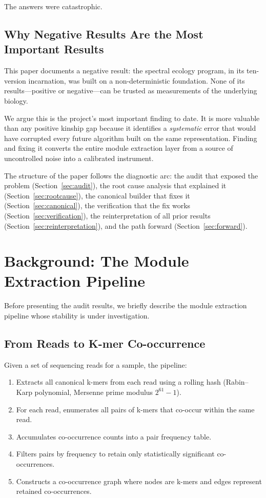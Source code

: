 \documentclass{../yalumba}
\begin{document}
The answers were catastrophic.

\subsection{Why Negative Results Are the Most Important Results}

This paper documents a negative result: the spectral ecology program, in its
ten-version incarnation, was built on a non-deterministic foundation. None of
its results---positive or negative---can be trusted as measurements of the
underlying biology.

We argue this is the project's most important finding to date. It is more
valuable than any positive kinship gap because it identifies a \textit{systematic}
error that would have corrupted every future algorithm built on the same
representation. Finding and fixing it converts the entire module extraction
layer from a source of uncontrolled noise into a calibrated instrument.

The structure of the paper follows the diagnostic arc: the audit that exposed
the problem (Section~\ref{sec:audit}), the root cause analysis that explained it
(Section~\ref{sec:rootcause}), the canonical builder that fixes it
(Section~\ref{sec:canonical}), the verification that the fix works
(Section~\ref{sec:verification}), the reinterpretation of all prior results
(Section~\ref{sec:reinterpretation}), and the path forward
(Section~\ref{sec:forward}).


\section{Background: The Module Extraction Pipeline}
\label{sec:background}

Before presenting the audit results, we briefly describe the module extraction
pipeline whose stability is under investigation.

\subsection{From Reads to K-mer Co-occurrence}

Given a set of sequencing reads for a sample, the pipeline:
\begin{enumerate}[leftmargin=2em]
  \item Extracts all canonical k-mers from each read using a rolling hash
    (Rabin--Karp polynomial, Mersenne prime modulus $2^{61}-1$).
  \item For each read, enumerates all pairs of k-mers that co-occur within
    the same read.
  \item Accumulates co-occurrence counts into a pair frequency table.
  \item Filters pairs by frequency to retain only statistically significant
    co-occurrences.
  \item Constructs a co-occurrence graph where nodes are k-mers and edges
    represent retained co-occurrences.
\end{enumerate}
\end{document}
